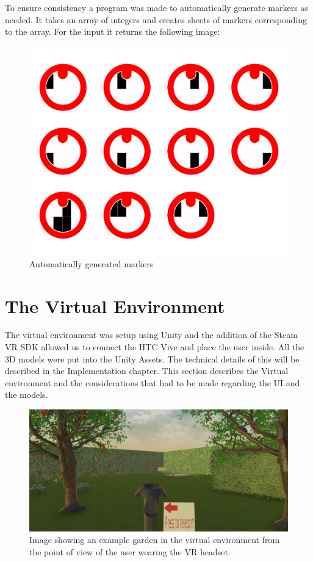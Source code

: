 To ensure consistency a program was made to automatically generate markers as needed. It takes an array of integers and creates sheets of markers corresponding to the array. For the input  it returns the following image:
\begin{figure}[H]
	\centering
	\includegraphics[width=0.7\linewidth]{figure/Analysis/result}
	\caption{Automatically generated markers}
	\label{fig:result}
\end{figure}


\section{The Virtual Environment}
The virtual environment was setup using Unity and the addition of the Steam VR SDK allowed us to connect the HTC Vive and place the user inside. All the 3D models were put into the Unity Assets. The technical details of this will be described in the Implementation chapter. This section describes the Virtual environment and the considerations that had to be made regarding the UI and the models.

\begin{figure}[H]
	\centering
	\includegraphics[width=0.9\linewidth]{figure/Design/vrPov.png}
	\caption{Image showing an example garden in the virtual environment from the point of view of the user wearing the VR headset.}
	\label{fig:vrPov}
\end{figure}


